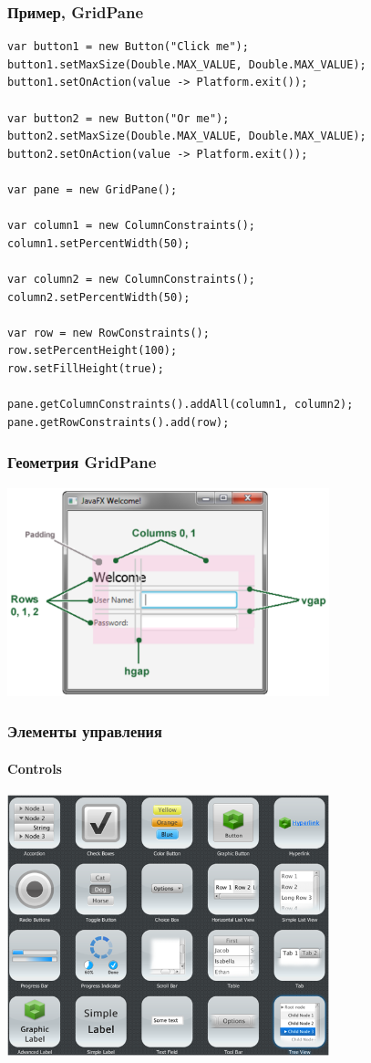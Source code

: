 \documentclass[xetex,mathserif,serif]{beamer}
\begin{document}
	\begin{frame}[fragile]
		\frametitle{Пример, GridPane}
		\begin{scriptsize}
			\begin{verbatim}
var button1 = new Button("Click me");
button1.setMaxSize(Double.MAX_VALUE, Double.MAX_VALUE);
button1.setOnAction(value -> Platform.exit());

var button2 = new Button("Or me");
button2.setMaxSize(Double.MAX_VALUE, Double.MAX_VALUE);
button2.setOnAction(value -> Platform.exit());

var pane = new GridPane();

var column1 = new ColumnConstraints();
column1.setPercentWidth(50);

var column2 = new ColumnConstraints();
column2.setPercentWidth(50);

var row = new RowConstraints();
row.setPercentHeight(100);
row.setFillHeight(true);

pane.getColumnConstraints().addAll(column1, column2);
pane.getRowConstraints().add(row);
			\end{verbatim}
		\end{scriptsize}
	\end{frame}

	\begin{frame}
		\frametitle{Геометрия GridPane}
		\begin{center}
			\includegraphics[width=0.7\textwidth]{gridGeometry.png}
		\end{center}
	\end{frame}

	\begin{frame}
		\frametitle{Элементы управления}
		\framesubtitle{Controls}
		\begin{center}
			\includegraphics[width=0.7\textwidth]{javaFxControls.png}
		\end{center}
	\end{frame}
\end{document}
